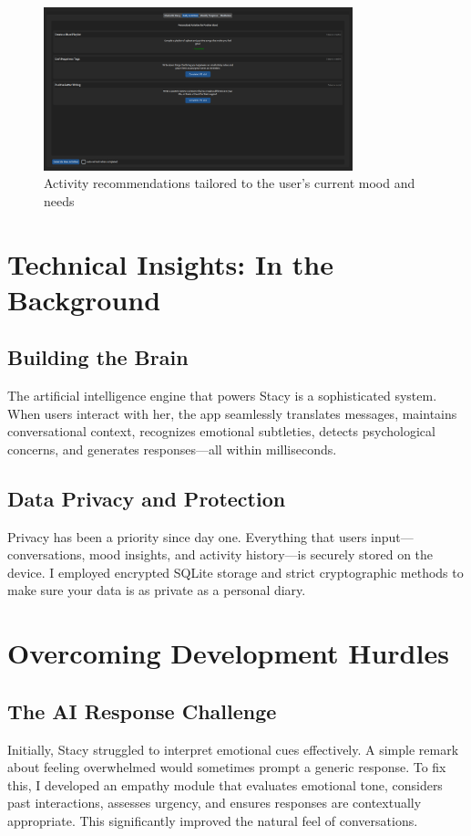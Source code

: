 \documentclass[12pt]{article}
\begin{document}
\begin{figure}[H]
  \centering
  \includegraphics[width=0.8\textwidth]{../images/Activities.png}
  \caption{Activity recommendations tailored to the user's current mood and needs}
\end{figure}

\section{Technical Insights: In the Background}

\subsection{Building the Brain}
The artificial intelligence engine that powers Stacy is a sophisticated system. When users interact with her, the app seamlessly translates messages, maintains conversational context, recognizes emotional subtleties, detects psychological concerns, and generates responses—all within milliseconds.

\subsection{Data Privacy and Protection}
Privacy has been a priority since day one. Everything that users input—conversations, mood insights, and activity history—is securely stored on the device. I employed encrypted SQLite storage and strict cryptographic methods to make sure your data is as private as a personal diary.

\section{Overcoming Development Hurdles}

\subsection{The AI Response Challenge}
Initially, Stacy struggled to interpret emotional cues effectively. A simple remark about feeling overwhelmed would sometimes prompt a generic response. To fix this, I developed an empathy module that evaluates emotional tone, considers past interactions, assesses urgency, and ensures responses are contextually appropriate. This significantly improved the natural feel of conversations.
\end{document}
